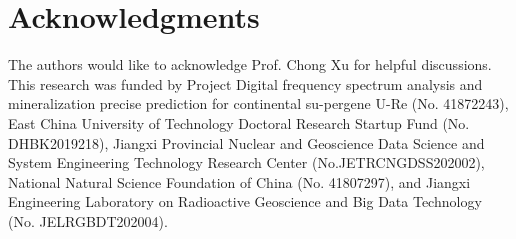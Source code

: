 \documentclass[a4paper,fleqn]{cas-sc}
\begin{document}
\section{Acknowledgments}

The authors would like to acknowledge Prof. Chong Xu for helpful discussions. 
This research was funded by Project Digital frequency spectrum analysis and mineralization precise prediction for continental su-pergene U-Re (No. 41872243), East China University of Technology Doctoral Research Startup Fund (No. DHBK2019218), Jiangxi Provincial Nuclear and Geoscience Data Science and System Engineering Technology Research Center (No.JETRCNGDSS202002), National Natural Science Foundation of China (No. 41807297), and Jiangxi Engineering Laboratory on Radioactive Geoscience and Big Data Technology (No. JELRGBDT202004).
\end{document}
